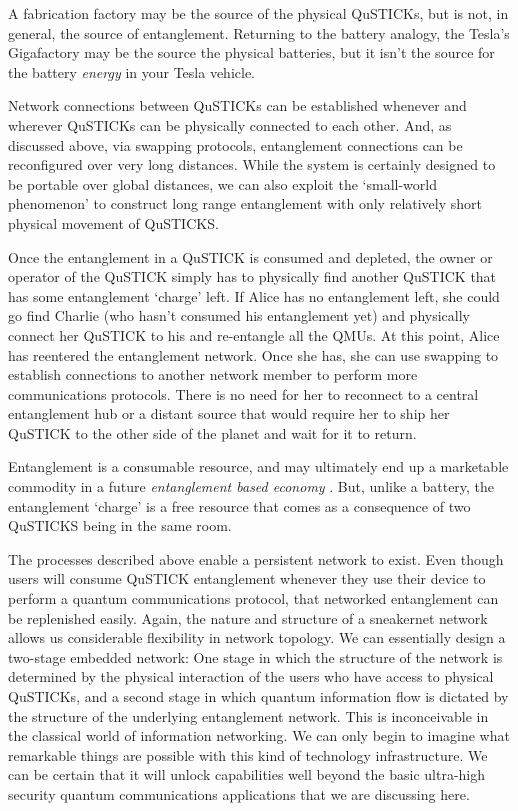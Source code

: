 \documentclass[twocolumn, aps, rmp, amsmath, amssymb, nofootinbib, superscriptaddress, longbibliography, floatfix, table-of-contents, eqsecnum]{revtex4-2}
\begin{document}
A fabrication factory may be the source of the physical QuSTICKs, but is not, in general, the source of entanglement. Returning to the battery analogy, the Tesla's Gigafactory may be the source the physical batteries, but it isn't the source for the battery \textit{energy} in your Tesla vehicle. 

Network connections between QuSTICKs can be established whenever and wherever QuSTICKs can be physically connected to each other. And, as discussed above, via swapping protocols, entanglement connections can be reconfigured over very long distances. While the system is certainly designed to be portable over global distances, we can also exploit the `small-world phenomenon' \cite{SD-Milgram1967} to construct long range entanglement with only relatively short physical movement of QuSTICKS. 

Once the entanglement in a QuSTICK is consumed and depleted, the owner or operator of the QuSTICK simply has to physically find another QuSTICK that has some entanglement `charge' left. If Alice has no entanglement left, she could go find Charlie (who hasn't consumed his entanglement yet) and physically connect her QuSTICK to his and re-entangle all the QMUs. At this point, Alice has reentered the entanglement network. Once she has, she can use swapping to establish connections to another network member to perform more communications protocols. There is no need for her to reconnect to a central entanglement hub or a distant source that would require her to ship her QuSTICK to the other side of the planet and wait for it to return. 

Entanglement is a consumable resource, and may ultimately end up a marketable commodity in a future {\em entanglement based economy} \cite{SD-Devitt:2016aa}. But, unlike a battery, the entanglement `charge' is a free resource that comes as a consequence of two QuSTICKS being in the same room.  

The processes described above enable a persistent network to exist. Even though users will consume QuSTICK entanglement whenever they use their device to perform a quantum communications protocol, that networked entanglement can be replenished easily. Again, the nature and structure of a sneakernet network allows us considerable flexibility in network topology. We can essentially design a two-stage embedded network: One stage in which the structure of the network is determined by the physical interaction of the users who have access to physical QuSTICKs, and a second stage in which quantum information flow is dictated by the structure of the underlying entanglement network. This is inconceivable in the classical world of information networking. We can only begin to imagine what remarkable things are possible with this kind of technology infrastructure. We can be certain that it will unlock capabilities well beyond the basic ultra-high security quantum communications applications that we are discussing here. 
\end{document}
